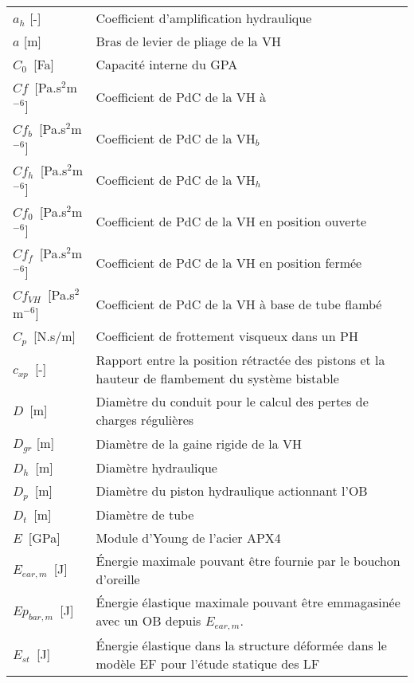 \begin{table}
      \begin{tabular}{l m{12cm}}
\toprule
$a_h$ [-]           & Coefficient d'amplification hydraulique                            \\
$a$ [m]         & Bras de levier de pliage de la VH                                  \\ \cline{1-1}
$C_0$~[Fa]       & Capacité interne du GPA \\
$Cf$~[Pa.s$^2$m$^{-6}$]            & Coefficient de PdC de la VH à   \\
$Cf_{b}$~[Pa.s$^2$m$^{-6}$]        & Coefficient de PdC de la VH$_b$                       \\
$Cf_{h}$~[Pa.s$^2$m$^{-6}$]        & Coefficient de PdC de la VH$_h$  \\
$Cf_{0}$~[Pa.s$^2$m$^{-6}$]        & Coefficient de PdC de la VH en position ouverte                    \\
$Cf_{f}$~[Pa.s$^2$m$^{-6}$]        & Coefficient de PdC de la VH en position fermée                     \\
$Cf_{VH}$~[Pa.s$^2$m$^{-6}$]       & Coefficient de PdC de la VH à base de tube flambé   \\
$C_p$~[N.s/m]    & Coefficient de frottement visqueux dans un PH \\
$c_{xp}$~[-]      & Rapport entre la position rétractée des pistons et la hauteur de flambement du système bistable \\  \cline{1-1}
$D$~[m]              & Diamètre du conduit pour le calcul des pertes de charges régulières    \\
$D_{gr}$ [m]         & Diamètre de la gaine rigide de la VH                               \\
$D_h$~[m]           & Diamètre hydraulique \\ 
$D_p$~[m]            & Diamètre du piston hydraulique actionnant l'OB                \\
$D_t$~[m]       & Diamètre de tube \\  \cline{1-1}
$E$~[GPa]    & Module d'Young de l'acier APX4 \\
$E_{ear,m}$~[J]          & Énergie maximale pouvant être fournie par le bouchon d'oreille \\
$Ep_{bar,m}$~[J]         & Énergie élastique maximale pouvant être emmagasinée avec un OB depuis $E_{ear,m}$. \\
$E_{st}$~[J]          & Énergie élastique dans la structure déformée dans le modèle EF pour l'étude statique des LF \\

\end{tabular}
\end{table}
